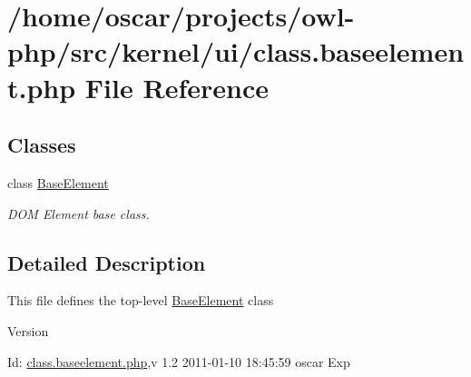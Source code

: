 \section{/home/oscar/projects/owl-\/php/src/kernel/ui/class.baseelement.php File Reference}
\label{class_8baseelement_8php}
\subsection*{Classes}
\begin{DoxyCompactItemize}
\item 
class \hyperlink{classBaseElement}{BaseElement}
\begin{DoxyCompactList}\small\item\em DOM Element base class. \item\end{DoxyCompactList}\end{DoxyCompactItemize}


\subsection{Detailed Description}
This file defines the top-\/level \hyperlink{classBaseElement}{BaseElement} class \begin{DoxyVersion}{Version}

\end{DoxyVersion}
\begin{DoxyParagraph}{Id:}
\hyperlink{class_8baseelement_8php}{class.baseelement.php},v 1.2 2011-\/01-\/10 18:45:59 oscar Exp 
\end{DoxyParagraph}
